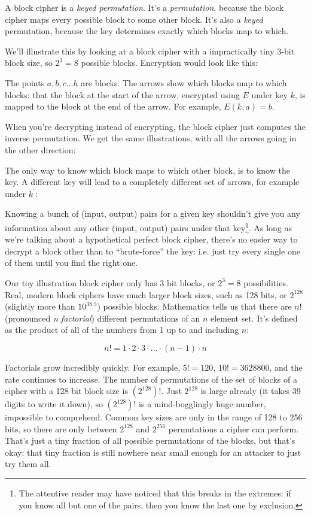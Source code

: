 \documentclass[11pt,ebook,table,dvipsnames]{memoir}
\begin{document}
A block cipher is a \emph{keyed permutation}. It's a \emph{permutation}, because
the block cipher maps every possible block to some other block. It's
also a \emph{keyed} permutation, because the key determines exactly which
blocks map to which.

We'll illustrate this by looking at a block cipher with a
impractically tiny 3-bit block size, so $2^3 = 8$ possible blocks.
Encryption would look like this:


The points $a, b, c \ldots h$ are blocks. The arrows show which blocks
map to which blocks: that the block at the start of the arrow,
encrypted using $E$ under key $k$, is mapped to the block at the end
of the arrow. For example, $E(k, a) = b$.

When you're decrypting instead of encrypting, the block cipher just
computes the inverse permutation. We get the same illustrations, with
all the arrows going in the other direction:


The only way to know which block maps to which other block, is to know
the key. A different key will lead to a completely different set of
arrows, for example under $k^{\prime}$:


Knowing a bunch of (input, output) pairs for a given key shouldn't
give you any information about any other (input, output) pairs under
that key\footnote{The attentive reader may have noticed that this breaks in
the extremes: if you know all but one of the pairs, then you know the
last one by exclusion.}. As long as we're talking about a hypothetical
perfect block cipher, there's no easier way to decrypt a block other
than to \enquote{brute-force} the key: i.e. just try every single one of them
until you find the right one.

Our toy illustration block cipher only has 3 bit blocks, or $2^3 = 8$
possibilities. Real, modern block ciphers have much larger block
sizes, such as 128 bits, or $2^{128}$ (slightly more than $10^{38.5}$)
possible blocks. Mathematics tells us that there are $n!$ (pronounced
\emph{n factorial}) different permutations of an $n$ element set. It's
defined as the product of all of the numbers from 1 up to and
including $n$:

\[
n! = 1 \cdot 2 \cdot 3 \cdot \ldots \cdot (n - 1) \cdot n
\]

Factorials grow incredibly quickly. For example, $5! = 120$, $10! =
3628800$, and the rate continues to increase. The number of
permutations of the set of blocks of a cipher with a 128 bit block
size is $(2^{128})!$. Just $2^{128}$ is large already (it takes 39
digits to write it down), so $(2^{128})!$ is a mind-bogglingly huge
number, impossible to comprehend. Common key sizes are only in the
range of 128 to 256 bits, so there are only between $2^{128}$ and
$2^{256}$ permutations a cipher can perform. That's just a tiny
fraction of all possible permutations of the blocks, but that's okay:
that tiny fraction is still nowhere near small enough for an attacker
to just try them all.
\end{document}
